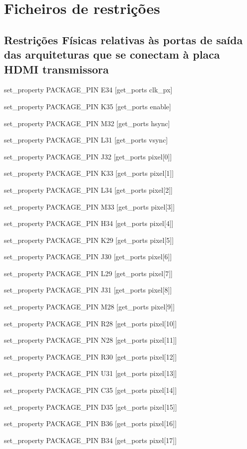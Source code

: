 {\tiny \chapter{Ficheiros de restrições} \label{ap2:codigo}}

\section{Restrições Físicas relativas às portas de saída das arquiteturas que se conectam à placa HDMI transmissora} \label{ap:fisicas_paraHDMI}
\small{
set\_property PACKAGE\_PIN E34 [get\_ports clk\_px]

set\_property PACKAGE\_PIN K35 [get\_ports enable]

set\_property PACKAGE\_PIN M32 [get\_ports hsync]

set\_property PACKAGE\_PIN L31 [get\_ports vsync]

set\_property PACKAGE\_PIN J32 [get\_ports {pixel[0]}]

set\_property PACKAGE\_PIN K33 [get\_ports {pixel[1]}]

set\_property PACKAGE\_PIN L34 [get\_ports {pixel[2]}]

set\_property PACKAGE\_PIN M33 [get\_ports {pixel[3]}]

set\_property PACKAGE\_PIN H34 [get\_ports {pixel[4]}]

set\_property PACKAGE\_PIN K29 [get\_ports {pixel[5]}]

set\_property PACKAGE\_PIN J30 [get\_ports {pixel[6]}]

set\_property PACKAGE\_PIN L29 [get\_ports {pixel[7]}]

set\_property PACKAGE\_PIN J31 [get\_ports {pixel[8]}]

set\_property PACKAGE\_PIN M28 [get\_ports {pixel[9]}]

set\_property PACKAGE\_PIN R28 [get\_ports {pixel[10]}]

set\_property PACKAGE\_PIN N28 [get\_ports {pixel[11]}]

set\_property PACKAGE\_PIN R30 [get\_ports {pixel[12]}]

set\_property PACKAGE\_PIN U31 [get\_ports {pixel[13]}]

set\_property PACKAGE\_PIN C35 [get\_ports {pixel[14]}]

set\_property PACKAGE\_PIN D35 [get\_ports {pixel[15]}]

set\_property PACKAGE\_PIN B36 [get\_ports {pixel[16]}]

set\_property PACKAGE\_PIN B34 [get\_ports {pixel[17]}]

}
